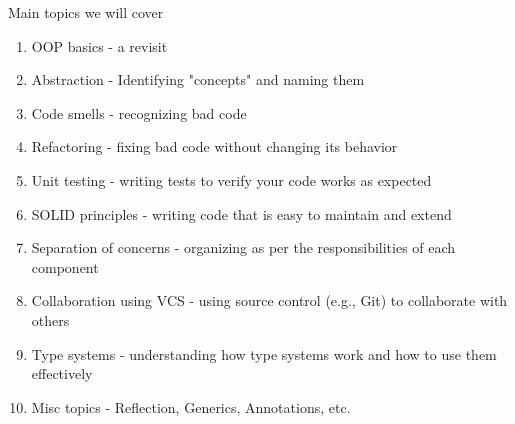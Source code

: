 \begin{frame}[allowframebreaks]{Main topics we will cover}

    \begin{enumerate}
        \item OOP basics - a revisit
        \item Abstraction - Identifying "concepts" and naming them 
        \item Code smells - recognizing bad code
        \item Refactoring - fixing bad code without changing its behavior
        \item Unit testing - writing tests to verify your code works as expected
        \item SOLID principles - writing code that is easy to maintain and extend
        \item Separation of concerns - organizing as per the responsibilities of each component
        \item Collaboration using VCS - using source control (e.g., Git) to collaborate with others
        \item Type systems - understanding how type systems work and how to use them effectively
        \item Misc topics - Reflection, Generics, Annotations, etc.
    \end{enumerate}
\end{frame}
